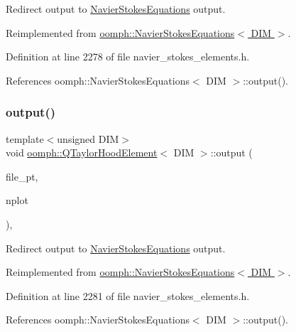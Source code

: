 Redirect output to \hyperlink{classoomph_1_1NavierStokesEquations}{Navier\+Stokes\+Equations} output. 



Reimplemented from \hyperlink{classoomph_1_1NavierStokesEquations_acb921a406e5825d9b17ed41c40317e4a}{oomph\+::\+Navier\+Stokes\+Equations$<$ D\+I\+M $>$}.



Definition at line 2278 of file navier\+\_\+stokes\+\_\+elements.\+h.



References oomph\+::\+Navier\+Stokes\+Equations$<$ D\+I\+M $>$\+::output().

\mbox{\label{classoomph_1_1QTaylorHoodElement_a0544106fc73db26d59619f6303b5803c}} 
\subsubsection{\texorpdfstring{output()}{output()}\hspace{0.1cm}{\footnotesize\ttfamily [4/4]}}
{\footnotesize\ttfamily template$<$unsigned D\+IM$>$ \\
void \hyperlink{classoomph_1_1QTaylorHoodElement}{oomph\+::\+Q\+Taylor\+Hood\+Element}$<$ D\+IM $>$\+::output (\begin{DoxyParamCaption}\item[{F\+I\+LE $\ast$}]{file\+\_\+pt,  }\item[{const unsigned \&}]{nplot }\end{DoxyParamCaption})\hspace{0.3cm}{\ttfamily [inline]}, {\ttfamily [virtual]}}



Redirect output to \hyperlink{classoomph_1_1NavierStokesEquations}{Navier\+Stokes\+Equations} output. 



Reimplemented from \hyperlink{classoomph_1_1NavierStokesEquations_af09ce1e73bca9a9ac93cb2e34de24f6b}{oomph\+::\+Navier\+Stokes\+Equations$<$ D\+I\+M $>$}.



Definition at line 2281 of file navier\+\_\+stokes\+\_\+elements.\+h.



References oomph\+::\+Navier\+Stokes\+Equations$<$ D\+I\+M $>$\+::output().

